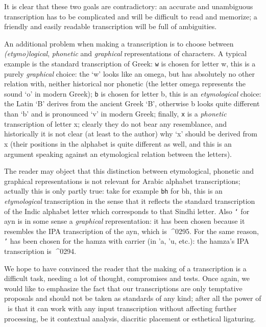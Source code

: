 \documentclass[a4paper,11pt]{article}
\def\shortarab#1{{\pushocplist\ArabicOCP\fontfamily{omarb}\selectfont#1\popocplist}}
\def\shortgreek#1{{\pushocplist\GreekOCP\fontfamily{omlgc}\selectfont#1\popocplist}}
\def\shortsindhi#1{{\pushocplist\SindhiOCP\fontfamily{omarb}\selectfont#1\popocplist}}
\begin{document}
It is clear that these two goals are contradictory: an accurate and
unambiguous transcription has to be complicated and will be difficult
to read and memorize; a friendly and easily readable transcription
will be full of ambiguities.

An additional problem when making a transcription is to choose between
\emph{(etymo)logical}, \emph{phonetic} and \emph{graphical}
representations of characters. A typical example is the standard
\OMEGA{} transcription of Greek: \texttt{w} is chosen for letter
\shortgreek{w}, this is a purely \emph{graphical} choice: the `w'
looks like an omega, but has absolutely no other relation with,
neither historical nor phonetic (the letter omega represents the sound
`o' in modern Greek); \texttt{b} is chosen for letter \shortgreek{b},
this is an \emph{etymological} choice: the Latin `B' derives from the
ancient Greek `B', otherwise \shortgreek{b} looks quite different than
`b' and is pronounced `v' in modern Greek; finally, \texttt{x} is a
\emph{phonetic} transcription of letter \shortgreek{x}; clearly they
do not bear any resemblance, and historically it is not clear (at
least to the author) why `x' should be derived from \shortgreek{x}
(their positions in the alphabet is quite different as well, and this
is an argument speaking against an etymological relation between the
letters).

The reader may object that this distinction between etymological,
phonetic and graphical representations is not relevant for Arabic
alphabet transcriptions; actually this is only partly true: take for
example \texttt{bh} for \shortsindhi{bh}, this is an
\emph{etymological} transcription in the sense that it reflects the
standard transcription of the Indic alphabet letter which corresponds
to that Sindhi letter. Also \texttt{`} for ayn is in some sense a
\emph{graphical} representation: it has been chosen because it
resembles the IPA transcription of the ayn, which is ^^^^0295. For the
same reason, \texttt{'} has been chosen for the hamza with carrier (in
\shortarab{'a}, \shortarab{'u}, etc.): the hamza's IPA transcription
is ^^^^0294.

We hope to have convinced the reader that the making of a
transcription is a difficult task, needing a lot of thought,
compromises and tests. Once again, we would like to emphasize the fact
that our transcriptions are only temptative proposals and should not
be taken as standards of any kind; after all the power of \OMEGA\ is
that it can work with any input transcription without affecting
further processing, be it contextual analysis, diacritic placement or
esthetical ligaturing.
\end{document}
